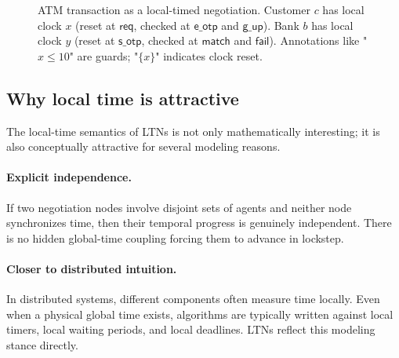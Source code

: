 \begin{figure}[t]
\caption{ATM transaction as a local-timed negotiation. Customer $c$ has local clock $x$ (reset at $\mathsf{req}$, checked at $\mathsf{e\_otp}$ and $\mathsf{g\_up}$). Bank $b$ has local clock $y$ (reset at $\mathsf{s\_otp}$, checked at $\mathsf{match}$ and $\mathsf{fail}$). Annotations like "$x \leq 10$" are guards; "$\{x\}$" indicates clock reset.}
\label{fig:ATM}
\end{figure}

\subsection{Why local time is attractive}

The local-time semantics of LTNs is not only mathematically interesting; it is also conceptually attractive for several modeling reasons.

\paragraph{Explicit independence.}
If two negotiation nodes involve disjoint sets of agents and neither node synchronizes time, then their temporal progress is genuinely independent. There is no hidden global-time coupling forcing them to advance in lockstep.

\paragraph{Closer to distributed intuition.}
In distributed systems, different components often measure time locally. Even when a physical global time exists, algorithms are typically written against local timers, local waiting periods, and local deadlines. LTNs reflect this modeling stance directly.

